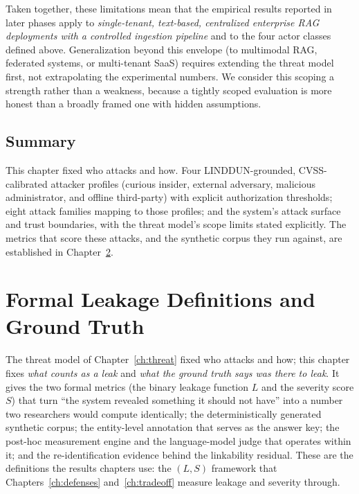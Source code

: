 \documentclass[12pt,a4paper]{report}
\begin{document}
Taken together, these limitations mean that the empirical results reported
in later phases apply to \emph{single-tenant, text-based, centralized
enterprise RAG deployments with a controlled ingestion pipeline} and
to the four actor classes defined above. Generalization beyond this
envelope (to multimodal RAG, federated systems, or multi-tenant SaaS) requires
extending the threat model first, not extrapolating the experimental numbers.
We consider this scoping a strength rather than a weakness, because a
tightly scoped evaluation is more honest than a broadly framed one with
hidden assumptions.



\section{Summary}
\label{sec:ch3-threat-summary}

This chapter fixed who attacks and how. Four LINDDUN-grounded, CVSS-calibrated attacker
profiles (curious insider, external adversary, malicious administrator, and offline
third-party) with explicit authorization thresholds; eight attack families mapping to those
profiles; and the system's attack surface and trust boundaries, with the threat model's scope
limits stated explicitly. The metrics that score these attacks, and the synthetic corpus they
run against, are established in Chapter~\ref{ch:formal}.


\chapter{Formal Leakage Definitions and Ground Truth}
\label{ch:formal}

The threat model of Chapter~\ref{ch:threat} fixed who attacks and how; this chapter fixes
\emph{what counts as a leak} and \emph{what the ground truth says was there to leak}. It gives
the two formal metrics (the binary leakage function $L$ and the severity score $S$) that
turn ``the system revealed something it should not have'' into a number two researchers would
compute identically; the deterministically generated synthetic corpus; the entity-level
annotation that serves as the answer key; the post-hoc measurement engine and the language-model
judge that operates within it; and the re-identification evidence behind the linkability
residual. These are the definitions the results chapters use: the $(L,S)$ framework that
Chapters~\ref{ch:defenses} and~\ref{ch:tradeoff} measure leakage and severity through.
\end{document}
